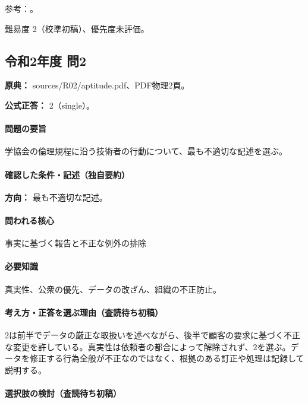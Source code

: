 \par 参考：\cite{fudano_ethics2021}。

\par 難易度 2（校準初稿）、優先度未評価。

\subsection{令和2年度 問2}
\label{q:r02-reg-apt-02}

\noindent\textbf{原典：} sources/R02/aptitude.pdf、PDF物理2頁。

\textbf{公式正答：} 2（single）。

\paragraph{問題の要旨} 学協会の倫理規程に沿う技術者の行動について、最も不適切な記述を選ぶ。

\paragraph{確認した条件・記述（独自要約）}\mbox{}\par

\noindent\textbf{方向：} 最も不適切な記述。\par

\paragraph{問われる核心} 事実に基づく報告と不正な例外の排除

\paragraph{必要知識} 真実性、公衆の優先、データの改ざん、組織の不正防止。

\paragraph{考え方・正答を選ぶ理由（査読待ち初稿）} 2は前半でデータの厳正な取扱いを述べながら、後半で顧客の要求に基づく不正な変更を許している。真実性は依頼者の都合によって解除されず、2を選ぶ。データを修正する行為全般が不正なのではなく、根拠のある訂正や処理は記録して説明する。

\paragraph{選択肢の検討（査読待ち初稿）}\mbox{}\par

